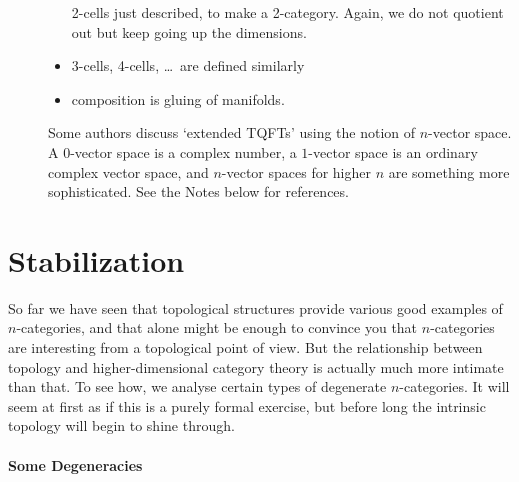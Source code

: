 \begin{description}
\begin{itemize}
2-cells just described, to make a 2-category.  Again, we do not quotient
out but keep going up the dimensions.
\item 3-cells, 4-cells, \ldots\ are defined similarly
\item composition is gluing of manifolds.
\end{itemize}
%
Some authors discuss `extended TQFTs' using the notion of $n$-vector
space.%
%
%
A $0$-vector space is a complex number, a $1$-vector space is an ordinary
complex vector space, and $n$-vector spaces for higher $n$ are something
more sophisticated.  See the Notes below for references.%
%
%
\end{description}



\section*{Stabilization}
%
%
%

So far we have seen that topological structures provide various good examples
of $n$-categories, and that alone might be enough to convince you that
$n$-categories are interesting from a topological point of view.  But the
relationship between topology and higher-dimensional category theory is
actually much more intimate than that.  To see how, we analyse certain
types of degenerate $n$-categories.  It will seem at first as if this is a
purely formal exercise, but before long the intrinsic topology will begin
to shine through.

\paragraph*{Some Degeneracies}

